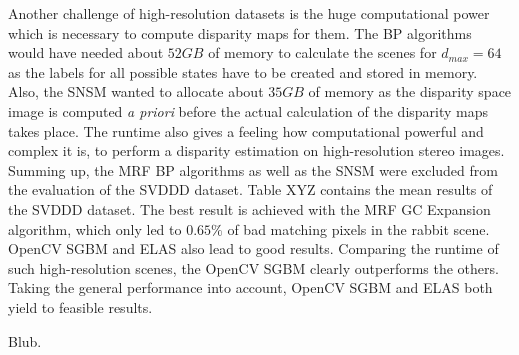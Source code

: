 \noindent Another challenge of high-resolution datasets is the huge computational power which is necessary to compute disparity maps for them.
The BP algorithms would have needed about $52 GB$ of memory to calculate the scenes for $d_{max} = 64$ as the labels for all possible states have to be created and stored in memory.
Also, the SNSM wanted to allocate about $35 GB$ of memory as the disparity space image is computed \textit{a priori} before the actual calculation of the disparity maps takes place.
The runtime also gives a feeling how computational powerful and complex it is, to perform a disparity estimation on high-resolution stereo images.
Summing up, the MRF BP algorithms as well as the SNSM were excluded from the evaluation of the SVDDD dataset.
\newline\newline\noindent Table XYZ contains the mean results of the SVDDD dataset.
The best result is achieved with the MRF GC Expansion algorithm, which only led to $0.65\%$ of bad matching pixels in the rabbit scene.
OpenCV SGBM and ELAS also lead to good results.
Comparing the runtime of such high-resolution scenes, the OpenCV SGBM clearly outperforms the others.
Taking the general performance into account, OpenCV SGBM and ELAS both yield to feasible results.




\begin{table}[h!]
\centering
{}
\caption[Result table for general performance of SVDDD]{Result table for general performance of SVDDD, focusing on PBMP$_{1px}$}
\end{table}

\noindent Blub.



